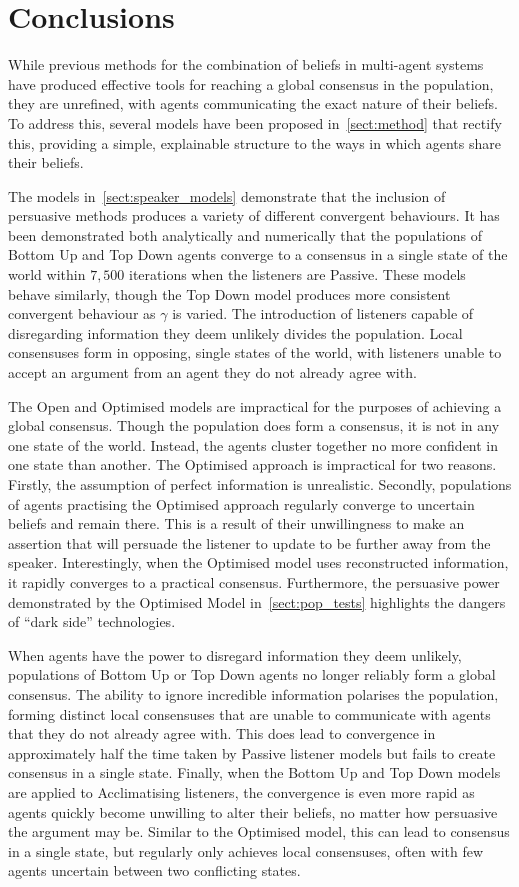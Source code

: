 \chapter{Conclusions}

While previous methods for the combination of beliefs in multi-agent systems have produced effective tools for reaching a global consensus in the population, they are unrefined, with agents communicating the exact nature of their beliefs. To address this, several models have been proposed in~\cref{sect:method} that rectify this, providing a simple, explainable structure to the ways in which agents share their beliefs. 


The models in~\cref{sect:speaker_models} demonstrate that the inclusion of persuasive methods produces a variety of different convergent behaviours. It has been demonstrated both analytically and numerically that the populations of Bottom Up and Top Down agents converge to a consensus in a single state of the world within $7,500$ iterations when the listeners are Passive. These models behave similarly, though the Top Down model produces more consistent convergent behaviour as $\gamma$ is varied. The introduction of listeners capable of disregarding information they deem unlikely divides the population. Local consensuses form in opposing, single states of the world, with listeners unable to accept an argument from an agent they do not already agree with.

The Open and Optimised models are impractical for the purposes of achieving a global consensus. Though the population does form a consensus, it is not in any one state of the world. Instead, the agents cluster together no more confident in one state than another. The Optimised approach is impractical for two reasons. Firstly, the assumption of perfect information is unrealistic. Secondly, populations of agents practising the Optimised approach regularly converge to uncertain beliefs and remain there. This is a result of their unwillingness to make an assertion that will persuade the listener to update to be further away from the speaker. Interestingly, when the Optimised model uses reconstructed information, it rapidly converges to a practical consensus. Furthermore, the persuasive power demonstrated by the Optimised Model in~\cref{sect:pop_tests} highlights the dangers of ``dark side'' technologies. 

When agents have the power to disregard information they deem unlikely, populations of Bottom Up or Top Down agents no longer reliably form a global consensus. The ability to ignore incredible information polarises the population, forming distinct local consensuses that are unable to communicate with agents that they do not already agree with. This does lead to convergence in approximately half the time taken by Passive listener models but fails to create consensus in a single state. Finally, when the Bottom Up and Top Down models are applied to Acclimatising listeners, the convergence is even more rapid as agents quickly become unwilling to alter their beliefs, no matter how persuasive the argument may be. Similar to the Optimised model, this can lead to consensus in a single state, but regularly only achieves local consensuses, often with few agents uncertain between two conflicting states. 

